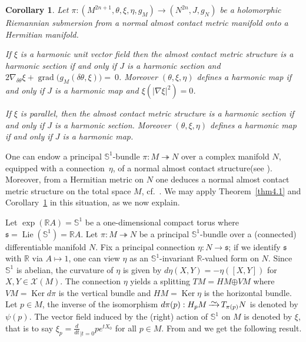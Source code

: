 \documentclass[a4paper,reqno]{amsart}
\newtheorem{corollary}[thm]{Corollary}
\theoremstyle{definition}
\theoremstyle{remark}
\theoremstyle{plain}
\numberwithin{equation}{section}
\newcommand{\R}{{\mathbb{R}}}
\newcommand{\bbS}{{\mathbb{S}}}
\newcommand{\calX}{{\mathcal{X}}}
\newcommand{\fs}{{\mathfrak{s}}}
\def\preisomto{\vbox{\hbox to
               14pt{\hfill$\sim$\hfill}\nointerlineskip\vskip -0.2pt
               \hbox to 14pt{\rightarrowfill}}}
\def\isomto{\mathop{\preisomto}}
\newcommand{\sto}{\twoheadrightarrow}
\newcommand{\mto}{\mapsto}
\def\Ker{\operatorname {Ker}}
\def\grad{\operatorname {grad}}
\def\Lie{\operatorname {Lie}}
\def\boplus{\mathbin{\boldsymbol{\oplus}}}
\newcommand{\NACS}{normal almost contact structure\xspace}
\newcommand{\NACMS}{normal almost contact metric
  structure\xspace}
\begin{document}
\begin{corollary}  \label{cor4.1}
Let $\pi: (M^{2n+1},\theta, \xi, \eta, g_M)\longrightarrow
(N^{2n}, J, g_N)$ be a holomorphic Riemannian submersion
from a normal almost contact metric  manifold onto a Hermitian manifold.  

If $\xi$ is a harmonic unit vector field then the almost contact metric
structure is a  harmonic section if and only if $ J$ is a
harmonic section and $2 \nabla_{\delta \theta} \xi 
+\grad \big( g_M(\delta \theta ,\xi)\big)=~0$.
Moreover $(\theta, \xi, \eta)$ defines a harmonic map if and only
if $ J$ is a harmonic map and $\xi(\vert \nabla
\xi\vert^2)=0$. 


If $\xi$ is parallel, then the almost contact metric structure is a
harmonic section if and only if $J$ is a harmonic
section. 
Moreover $(\theta, \xi, \eta)$ defines a harmonic map if and only
if $ J$ is a harmonic map.
\end{corollary}





One can endow a principal $\bbS^1$-bundle $\pi : M \sto N$ over a
complex manifold $N$, equipped with a connection~$\eta$, of a
\NACS (see \cite{Mor1}). Moreover, from a
Hermitian metric on $N$ one deduces a \NACMS on the total space
$M$, cf.~\cite{Hat,Mor1,Ogi}. %
We may apply Theorem~\ref{thm4.1} and
Corollary~\ref{cor4.1} in this situation, as we now explain.

 Let
 $ \exp(\R A) = \bbS^1$ be a one-dimensional compact torus
 where $\fs= \Lie(\bbS^1) = \R A$. Let $\pi : M \sto N$ be a
 principal $\bbS^1$-bundle over a (connected) differentiable manifold
 $N$. Fix a principal connection $\eta : N \to \fs$; if we
 identify $\fs$ with $\R$ via $A \mto 1$, one can view $\eta$ as
 an $\bbS^1$-invariant $\R$-valued form on $N$. Since $\bbS^1$ is abelian,
 the curvature of $\eta$ is given
 by $d\eta(X,Y)= - \eta([X,Y])$ for $X,Y \in \calX(M)$. The
 connection $\eta$ yields a splitting ${TM= HM \boplus VM}$
 where $VM = \Ker d\pi$ is the vertical bundle and
 $HM= \Ker \eta$ is the horizontal bundle. Let $p \in M$, the
 inverse of the isomorphism $d\pi(p) : H_pM \isomto T_{\pi(p)}N$
 is denoted by $\psi(p)$.  %
 The vector field
 induced by the (right) action of $\bbS^1$ on $M$ is denoted by
 $\xi$, that is to say
 $\xi_p= \frac{d}{dt}_{\mid t=0} p e^{t X_0}$ for all
 $p \in M$.  From \cite[\S2]{Hat} \cite[Theorem~6]{Mor1} and
 \cite[\S3]{Ogi} we get the following result.
\end{document}
